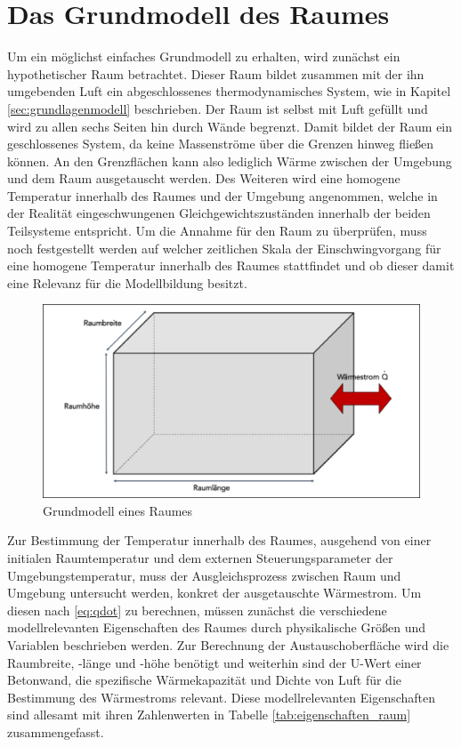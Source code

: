 \section{Das Grundmodell des Raumes}

Um ein möglichst einfaches Grundmodell zu erhalten, wird zunächst ein hypothetischer Raum betrachtet. Dieser Raum bildet zusammen mit der ihn umgebenden Luft ein abgeschlossenes thermodynamisches System, wie in Kapitel \ref{sec:grundlagenmodell} beschrieben. Der Raum ist selbst mit Luft gefüllt und wird zu allen sechs Seiten hin durch Wände begrenzt. Damit bildet der Raum ein geschlossenes System, da keine Massenströme über die Grenzen hinweg fließen können. An den Grenzflächen kann also lediglich Wärme zwischen der Umgebung und dem  Raum ausgetauscht werden. Des Weiteren wird eine homogene Temperatur innerhalb des Raumes und der Umgebung angenommen, welche in der Realität eingeschwungenen Gleichgewichtszuständen innerhalb der beiden Teilsysteme entspricht. Um die Annahme für den Raum zu überprüfen, muss noch festgestellt werden auf welcher zeitlichen Skala der Einschwingvorgang für eine homogene Temperatur innerhalb des Raumes stattfindet und ob dieser damit eine Relevanz für die Modellbildung besitzt.

\begin{figure}
\centering
\includegraphics[width=\textwidth]{abbildungen/20160316_grundraum}
\caption{Grundmodell eines Raumes}
\label{fig:grundraum}
\end{figure}

Zur Bestimmung der Temperatur innerhalb des Raumes, ausgehend von einer initialen Raumtemperatur und dem externen Steuerungsparameter der Umgebungstemperatur, muss der Ausgleichsprozess zwischen Raum und Umgebung untersucht werden, konkret der ausgetauschte Wärmestrom. Um diesen nach \ref{eq:qdot} zu berechnen, müssen zunächst die verschiedene modellrelevanten Eigenschaften des Raumes durch physikalische Größen und Variablen beschrieben werden. Zur Berechnung der Austauschoberfläche wird die Raumbreite, -länge und -höhe benötigt und weiterhin sind der U-Wert einer Betonwand, die spezifische Wärmekapazität und Dichte von Luft für die Bestimmung des Wärmestroms relevant.
Diese modellrelevanten Eigenschaften sind allesamt mit ihren Zahlenwerten in Tabelle \ref{tab:eigenschaften_raum} zusammengefasst.

